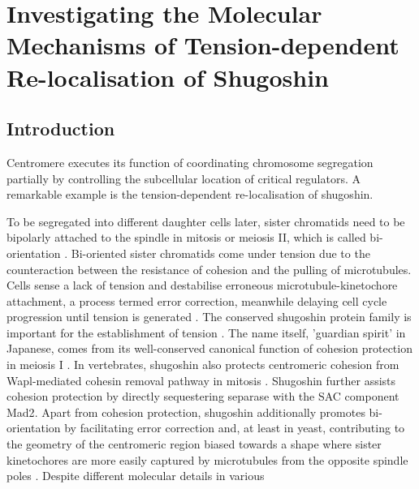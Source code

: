 \chapter{Investigating the Molecular Mechanisms of Tension-dependent Re-localisation of Shugoshin}

\section{Introduction}
Centromere executes its function of coordinating chromosome segregation partially by controlling the subcellular location of critical regulators. A remarkable example is the tension-dependent re-localisation of shugoshin. 

To be segregated into different daughter cells later, sister chromatids need to be bipolarly attached to the spindle in mitosis or meiosis II, which is called bi-orientation \citep{Tanaka2010Kinetochore-microtubuleBi-orientation}. Bi-oriented sister chromatids come under tension due to the counteraction between the resistance of cohesion and the pulling of microtubules. Cells sense a lack of tension and destabilise erroneous microtubule-kinetochore attachment, a process termed error correction, meanwhile delaying cell cycle progression until tension is generated \citep{Nicklas1997HowChromosomes, Nicklas1994, Tanaka2010Kinetochore-microtubuleBi-orientation}. The conserved shugoshin protein family is important for the establishment of tension \citep{Watanabe2005, Clift2011, Gutierrez-Caballero2012Shugoshins:Centromere, Marston2015, Zhang2020FunctioningMitosis}. The name itself, 'guardian spirit' in Japanese, comes from its well-conserved canonical function of cohesion protection in meiosis I \citep{Lister2010Age-relatedSgo2, Llano2008Shugoshin-2Mice, Lee2008, Rattani2013Sgol2Oocytes, Marston2004a, Kitajima2004a, Katis2004, Rabitsch2004TwoII, Kerrebrock1992TheDifferentiation, Cromer2013CentromericInterkinesis, Zamariola2014SHUGOSHINsThaliana, Wang2011OsSGO1Meiosis, Hamant2005AFunctions, Ma2021MeikinI, Miyazaki2017HierarchicalI}. In vertebrates, shugoshin also protects centromeric cohesion from Wapl-mediated cohesin removal pathway in mitosis \citep{Rivera2009ShugoshinExtracts, Shintomi2009ReleasingSgo1, Huang2007, Tang2006a, McGuinness2005ShugoshinCells, Kitajima2005, Salic2004VertebrateMitosis, Liang2019ACells}. Shugoshin further assists cohesion protection by directly sequestering separase with the SAC component Mad2\citep{Rattani2013Sgol2Oocytes, Hellmuth2020Securin-independentShugoshinMAD2, Orth2011ShugoshinMad2}. Apart from cohesion protection, shugoshin additionally promotes bi-orientation by facilitating error correction \citep{Meppelink2015Shugoshin-1Bi-orientation, Huang2007, Peplowska2014, Nerusheva2014, Verzijlbergen2014, Tsukahara2010a, Yamagishi2010, Hadders2020UntanglingMitosis, Broad2020AuroraCells, Kawashima2007, Vanoosthuyse2007, Rivera2012} and, at least in yeast, contributing to the geometry of the centromeric region biased towards a shape where sister kinetochores are more easily captured by microtubules from the opposite spindle poles \citep{Indjeian2007, Haase2012Bub1Dynamics, Verzijlbergen2014, Peplowska2014, Sane2021ShugoshinDisassembly}. Despite different molecular details in various 